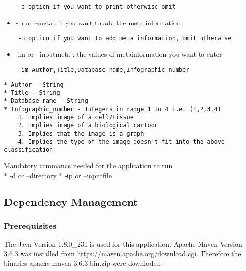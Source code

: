 \begin{verbatim}
    -p option if you want to print otherwise omit
\end{verbatim}

\begin{itemize}
\tightlist
\item
   -m or --meta : if you want to add the meta information 
\end{itemize}

\begin{verbatim}
    -m option if you want to add meta information, omit otherwise
\end{verbatim}

\begin{itemize}
\tightlist
\item
   -im or --inputmeta : the values of metainformation you want to enter 
\end{itemize}

\begin{verbatim}
    -im Author,Title,Database_name,Infographic_number 
\end{verbatim}

\begin{verbatim}
* Author - String 
* Title - String 
* Database_name - String
* Infographic_number - Integers in range 1 to 4 i.e. (1,2,3,4)
    1. Implies image of a cell/tissue
    2. Implies image of a biological cartoon
    3. Implies that the image is a graph
    4. Implies the type of the image doesn't fit into the above classification 
\end{verbatim}

Mandatory commands needed for the application to run \\
* -d or --directory * -ip or --inputfile

\hypertarget{dependency-management}{%
\subsection{Dependency Management}\label{dependency-management}}

\hypertarget{prerequisites}{%
\subsubsection{Prerequisites}\label{prerequisites}}

The Java Version 1.8.0\_231 is used for this application. Apache Maven
Version 3.6.3 was installed from https://maven.apache.org/download.cgi.
Therefore the binaries apache-maven-3.6.3-bin.zip were downloded.

